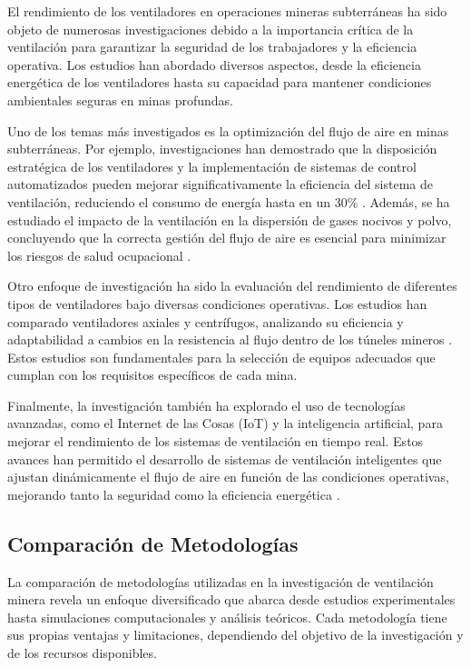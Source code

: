El rendimiento de los ventiladores en operaciones mineras subterráneas ha sido objeto de numerosas investigaciones debido a la importancia crítica de la ventilación para garantizar la seguridad de los trabajadores y la eficiencia operativa. Los estudios han abordado diversos aspectos, desde la eficiencia energética de los ventiladores hasta su capacidad para mantener condiciones ambientales seguras en minas profundas.

Uno de los temas más investigados es la optimización del flujo de aire en minas subterráneas. Por ejemplo, investigaciones han demostrado que la disposición estratégica de los ventiladores y la implementación de sistemas de control automatizados pueden mejorar significativamente la eficiencia del sistema de ventilación, reduciendo el consumo de energía hasta en un 30\% \cite{brune2008mine}. Además, se ha estudiado el impacto de la ventilación en la dispersión de gases nocivos y polvo, concluyendo que la correcta gestión del flujo de aire es esencial para minimizar los riesgos de salud ocupacional \cite{mutmansky2010ventilation}.

Otro enfoque de investigación ha sido la evaluación del rendimiento de diferentes tipos de ventiladores bajo diversas condiciones operativas. Los estudios han comparado ventiladores axiales y centrífugos, analizando su eficiencia y adaptabilidad a cambios en la resistencia al flujo dentro de los túneles mineros \cite{hardcastle2000performance}. Estos estudios son fundamentales para la selección de equipos adecuados que cumplan con los requisitos específicos de cada mina.

Finalmente, la investigación también ha explorado el uso de tecnologías avanzadas, como el Internet de las Cosas (IoT) y la inteligencia artificial, para mejorar el rendimiento de los sistemas de ventilación en tiempo real. Estos avances han permitido el desarrollo de sistemas de ventilación inteligentes que ajustan dinámicamente el flujo de aire en función de las condiciones operativas, mejorando tanto la seguridad como la eficiencia energética \cite{zhang2018iot}.

\subsection{Comparación de Metodologías}

La comparación de metodologías utilizadas en la investigación de ventilación minera revela un enfoque diversificado que abarca desde estudios experimentales hasta simulaciones computacionales y análisis teóricos. Cada metodología tiene sus propias ventajas y limitaciones, dependiendo del objetivo de la investigación y de los recursos disponibles.

